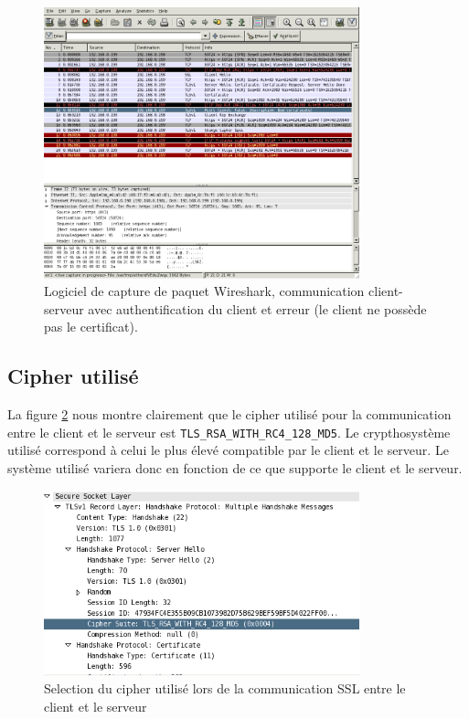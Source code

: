 \documentclass[10pt,a4paper,titlepage]{article}
\begin{document}
\begin{figure}[htbp]
   \begin{center}
      \includegraphics[width=345px]{img/wireshark-with-auth-ERROR.png}
   \end{center}
   \caption{Logiciel de capture de paquet Wireshark, communication client-serveur avec authentification du client et erreur (le client ne possède pas le certificat).}
	\label{fig:wireshark-userauthError}
\end{figure}

\subsection{Cipher utilisé}

La figure \ref{fig:wireshark-cipher} nous montre clairement que le cipher utilisé pour la communication entre le client et le serveur est \texttt{TLS\_RSA\_WITH\_RC4\_128\_MD5}. Le crypthosystème utilisé correspond à celui le plus élevé compatible par le client et le serveur. Le système utilisé variera donc en fonction de ce que supporte le client et le serveur.

\begin{figure}[htbp]
   \begin{center}
      \includegraphics[width=345px]{img/selected-cipher.png}
   \end{center}
   \caption{Selection du cipher utilisé lors de la communication SSL entre le client et le serveur}
	\label{fig:wireshark-cipher}
\end{figure}
\end{document}

